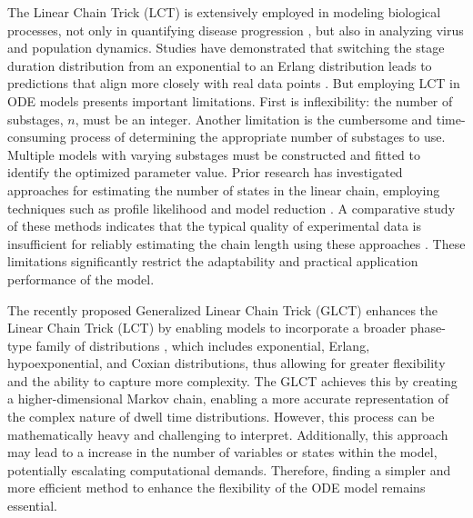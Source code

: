 \documentclass[12pt]{article}
\begin{document}
The Linear Chain Trick (LCT) is extensively employed in modeling biological processes, not only in quantifying disease progression \cite{lloyd2001destabilization}\cite{lloyd2001realistic}, but also in analyzing virus \cite{lloyd2001dependence}\cite{kakizoe2015method} and population \cite{cushing2013integrodifferential} dynamics. Studies have demonstrated that switching the stage duration distribution from an exponential to an Erlang distribution leads to predictions that align more closely with real data points \cite{kakizoe2015method}. But employing LCT in ODE models presents important limitations. First is inflexibility: the number of substages, $n$, must be an integer. Another limitation is the cumbersome and time-consuming process of determining the appropriate number of substages to use. Multiple models with varying substages must be constructed and fitted to identify the optimized parameter value. Prior research has investigated approaches for estimating the number of states in the linear chain, employing techniques such as profile likelihood \cite{raue2009structural} and model reduction \cite{maiwald2016driving}. A comparative study of these methods indicates that the typical quality of experimental data is insufficient for reliably estimating the chain length using these approaches \cite{hauber2020estimating}. These limitations significantly restrict the adaptability and practical application performance of the model.

The recently proposed Generalized Linear Chain Trick (GLCT) enhances the Linear Chain Trick (LCT) by enabling models to incorporate a broader phase-type family of distributions \cite{hurtado2019generalizations}\cite{hurtado2021building}\cite{bladt2017phase}, which includes exponential, Erlang, hypoexponential, and Coxian distributions, thus allowing for greater flexibility and the ability to capture more complexity. The GLCT achieves this by creating a higher-dimensional Markov chain, enabling a more accurate representation of the complex nature of dwell time distributions. However, this process can be mathematically heavy and challenging to interpret. Additionally, this approach may lead to a increase in the number of variables or states within the model, potentially escalating computational demands. Therefore, finding a simpler and more efficient method to enhance the flexibility of the ODE model remains essential.
\end{document}
